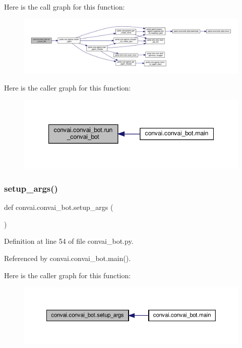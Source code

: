 Here is the call graph for this function\+:
\nopagebreak
\begin{figure}[H]
\begin{center}
\leavevmode
\includegraphics[width=350pt]{namespaceconvai_1_1convai__bot_aa48fc69074ce03959653a0122c4a0b67_cgraph}
\end{center}
\end{figure}
Here is the caller graph for this function\+:
\nopagebreak
\begin{figure}[H]
\begin{center}
\leavevmode
\includegraphics[width=347pt]{namespaceconvai_1_1convai__bot_aa48fc69074ce03959653a0122c4a0b67_icgraph}
\end{center}
\end{figure}
\mbox{\label{namespaceconvai_1_1convai__bot_a3bfdfe9427fd3c0afc9c28f092953ec2}} 
\subsubsection{\texorpdfstring{setup\+\_\+args()}{setup\_args()}}
{\footnotesize\ttfamily def convai.\+convai\+\_\+bot.\+setup\+\_\+args (\begin{DoxyParamCaption}{ }\end{DoxyParamCaption})}



Definition at line 54 of file convai\+\_\+bot.\+py.



Referenced by convai.\+convai\+\_\+bot.\+main().

Here is the caller graph for this function\+:
\nopagebreak
\begin{figure}[H]
\begin{center}
\leavevmode
\includegraphics[width=350pt]{namespaceconvai_1_1convai__bot_a3bfdfe9427fd3c0afc9c28f092953ec2_icgraph}
\end{center}
\end{figure}
